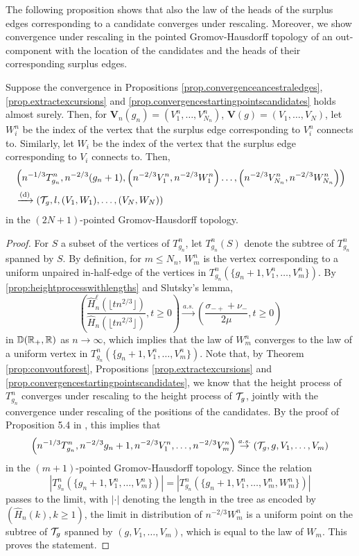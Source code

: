 The following proposition shows that also the law of the heads of the surplus edges corresponding to a candidate converges under rescaling. Moreover, we show convergence under rescaling in the pointed Gromov-Hausdorff topology of an out-component with the location of the candidates and the heads of their corresponding surplus edges. 
\begin{proposition}\label{prop.convergenceheadscandidates}
Suppose the convergence in Propositions \ref{prop.convergenceancestraledges}, \ref{prop.extractexcursions} and \ref{prop.convergencestartingpointscandidates} holds almost surely. Then, for $\mathbf{V}_n(g_n)=(V^n_1,\dots, V^n_{N_n})$, $\mathbf{V}(g)=(V_1,\dots, V_{N})$, let $W^n_i$ be the index of the vertex that the surplus edge corresponding to $V^n_i$ connects to. Similarly, let $W_i$ be the index of the vertex that the surplus edge corresponding to $V_i$ connects to. Then, 
\begin{align*}&\left(n^{-1/3}T^n_{g_n}, n^{-2/3}(g_n+1), \left(n^{-2/3}V^n_1,n^{-2/3}W^n_1\right) \dots, \left(n^{-2/3}V^n_{N_n}, n^{-2/3}W^n_{N_n}\right)\right)\\
&\todist\left(\cT_g, l, (V_1,W_1),\dots, (V_{N},W_{N})\right)\end{align*}
in the $(2N+1)$-pointed Gromov-Hausdorff topology. 
\end{proposition}
\begin{proof}
For $S$ a subset of the vertices of $T^n_{g_n}$, let $T^n_{g_n}(S)$ denote the subtree of $T^n_{g_n}$ spanned by $S$. By definition, for $m\leq N_n$, $W^n_m$ is the vertex corresponding to a uniform unpaired in-half-edge of the vertices in $T^n_{g_n}\left(\{g_n+1,V^n_1,\dots,V^n_{m}\}\right)$. By  \cref{prop:heightprocesswithlengths} and Slutsky's lemma,
$$\left(\frac{\hat{H}_n^\ell\left(\lfloor t n^{2/3}\rfloor \right)}{\hat{H}_n\left(\lfloor t n^{2/3}\rfloor \right)},t\geq 0\right)\overset{a.s.}{\to} \left(\frac{\sigma_{-+}+\nu_-}{2\mu},t\geq 0\right)$$
in ${\mathbb D}({\mathbb R}_+,{\mathbb R})$ as $n\to \infty$, which implies that the law of $W^n_m$ converges to the law of a uniform vertex in $T^n_{g_n}\left(\{g_n+1,V^n_1,\dots,V^n_{m}\}\right)$. 
Note that, by Theorem \ref{prop:convoutforest},  Propositions \ref{prop.extractexcursions} and \ref{prop.convergencestartingpointscandidates}, we know that the height process of $T^n_{g_n}$ converges under rescaling to the height process of ${\mathcal T}_g$, jointly with the convergence under rescaling of the positions of the candidates. By the proof of Proposition 5.4 in \cite{goldschmidtScalingLimitCritical2019}, this implies that
$$\left(n^{-1/3}T^n_{g_n},n^{-2/3}g_n+1,n^{-2/3}V^n_1,\dots,n^{-2/3}V^n_{m}\right)\overset{a.s.}{\to}\left({\mathcal T}_g, g,V_1,\dots,V_m\right)$$
in the $(m+1)$-pointed Gromov-Hausdorff topology. Since the relation $$\left|T^n_{g_n}\left(\{g_n+1,V^n_1,\dots,V^n_{m}\}\right)\right|=\left|T^n_{g_n}\left(\{g_n+1,V^n_1,\dots,V^n_{m}, W^n_{m}\}\right)\right|$$ passes to the limit, with $|\cdot|$ denoting the length in the tree as encoded by $(\hat{H}_n(k),k\geq 1)$, the limit in distribution of $n^{-2/3}W^n_m$ is a uniform point on the subtree of ${\mathcal T}_g$ spanned by $\left(g,V_1,\dots,V_m\right)$, which is equal to the law of $W_m$. This proves the statement.
\end{proof}

